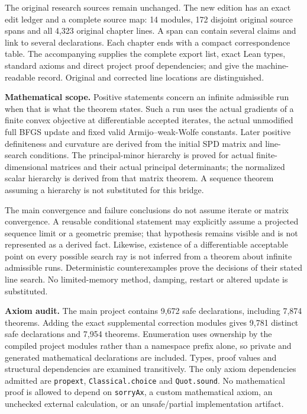 \documentclass[10pt,oneside,openany]{book}
\theoremstyle{remark}\newtheorem{remark}{Remark}[chapter]
\begin{document}
The original research sources remain unchanged. The new edition has an exact edit ledger and a complete source map: 14 modules, 172 disjoint original source spans and all 4,323 original chapter lines. A span can contain several claims and link to several declarations. Each chapter ends with a compact correspondence table. The accompanying  supplies the complete export list, exact Lean types, standard axioms and direct project proof dependencies;  and  give the machine-readable record. Original and corrected line locations are distinguished.

\textbf{Mathematical scope.} Positive statements concern an infinite admissible run when that is what the theorem states. Such a run uses the actual gradients of a finite convex objective at differentiable accepted iterates, the actual unmodified full BFGS update and fixed valid Armijo--weak-Wolfe constants. Later positive definiteness and curvature are derived from the initial SPD matrix and line-search conditions. The principal-minor hierarchy is proved for actual finite-dimensional matrices and their actual principal determinants; the normalized scalar hierarchy is derived from that matrix theorem. A sequence theorem assuming a hierarchy is not substituted for this bridge.

The main convergence and failure conclusions do not assume iterate or matrix convergence. A reusable conditional statement may explicitly assume a projected sequence limit or a geometric premise; that hypothesis remains visible and is not represented as a derived fact. Likewise, existence of a differentiable acceptable point on every possible search ray is not inferred from a theorem about infinite admissible runs. Deterministic counterexamples prove the decisions of their stated line search. No limited-memory method, damping, restart or altered update is substituted.

\textbf{Axiom audit.} The main project contains 9,672 safe declarations, including 7,874 theorems. Adding the exact supplemental correction modules gives 9,781 distinct safe declarations and 7,954 theorems. Enumeration uses ownership by the compiled project modules rather than a namespace prefix alone, so private and generated mathematical declarations are included. Types, proof values and structural dependencies are examined transitively. The only axiom dependencies admitted are \texttt{propext}, \texttt{Classical.choice} and \texttt{Quot.sound}. No mathematical proof is allowed to depend on \texttt{sorryAx}, a custom mathematical axiom, an unchecked external calculation, or an unsafe/partial implementation artifact.
\end{document}

